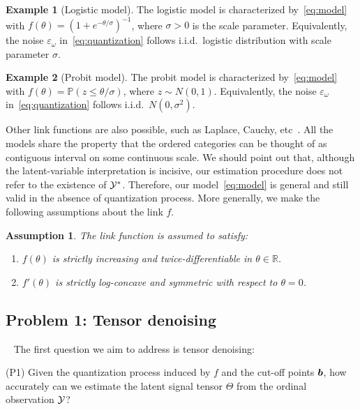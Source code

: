 \documentclass{article}
\theoremstyle{plain}
\newtheorem{assumption}{Assumption}
\theoremstyle{definition}
\newtheorem{example}{Example}
\begin{document}
\begin{example}[Logistic model] The logistic model is characterized by~\eqref{eq:model} with $f(\theta)=(1+e^{-\theta/\sigma})^{-1}$, where $\sigma>0$ is the scale parameter. Equivalently, the noise $\varepsilon_\omega$ in~\eqref{eq:quantization} follows i.i.d.\ logistic distribution with scale parameter $\sigma$.
\end{example}
\begin{example}[Probit model] The probit model is characterized by~\eqref{eq:model} with
$f(\theta)=\mathbb{P}(z\leq \theta/\sigma)$, where $z\sim N(0,1)$. Equivalently, the noise $\varepsilon_\omega$ in~\eqref{eq:quantization} follows i.i.d.\ $N(0,\sigma^2)$.
\end{example}
Other link functions are also possible, such as Laplace, Cauchy, etc~\cite{mccullagh1980regression}. All the models share the property that the ordered categories can be thought of as contiguous interval on some continuous scale. We should point out that, although the latent-variable interpretation is incisive, our estimation procedure does not refer to the existence of $\mathcal{Y}^*$. Therefore, our model~\eqref{eq:model} is general and still valid in the absence of quantization process. More generally, we make the following assumptions about the link $f$.

\begin{assumption}\label{ass:link}
The link function is assumed to satisfy:
\vspace{-.2cm}
\begin{enumerate}
\item $f(\theta)$ is strictly increasing and twice-differentiable in $\theta\in \mathbb{R}$.
\item $f'(\theta)$ is strictly log-concave and symmetric with respect to $\theta=0$.
\end{enumerate}
\end{assumption}

\subsection{Problem 1: Tensor denoising}~\label{sec:denoising}
\vspace{-.1cm}
The first question we aim to address is tensor denoising:

(P1) Given the quantization process induced by $f$ and the cut-off points $\bm{b}$, how accurately can we estimate the latent signal tensor $\Theta$ from the ordinal observation $\mathcal{Y}$?
\end{document}
